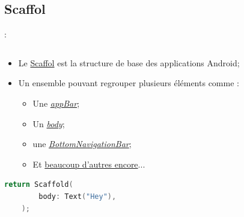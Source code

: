 \documentclass[10pt]{beamer}
\begin{document}
\subsection{Scaffol}
\begin{frame}[fragile,t]{\secname : \subsecname}
    \begin{columns}
        \begin{column}{0.5\textwidth}
            \begin{itemize}
                \item Le \href{https://api.flutter.dev/flutter/material/Scaffold-class.html}{Scaffol}  est la structure de base des applications Android;
                \item Un ensemble pouvant regrouper plusieurs éléments comme :
                      \begin{itemize}
                          \item Une \href{https://api.flutter.dev/flutter/material/AppBar-class.html}{\emph{appBar}};
                          \item Un \href{https://api.flutter.dev/flutter/material/Scaffold/body.html}{\emph{body}};
                          \item une \href{https://api.flutter.dev/flutter/material/BottomNavigationBar-class.html}{\emph{BottomNavigationBar}};
                          \item Et \href{https://api.flutter.dev/flutter/material/material-library.html}{beaucoup d'autres encore}...
                      \end{itemize}
            \end{itemize}
            \begin{lstlisting}[language=C]
    return Scaffold(
        body: Text("Hey"),
    );
        \end{lstlisting}
        \end{column}
        \begin{column}{0.5\textwidth}
            \begin{figure}
                \begin{center}

\end{center}
\end{figure}
\end{column}
\end{columns}
\end{frame}
\end{document}
